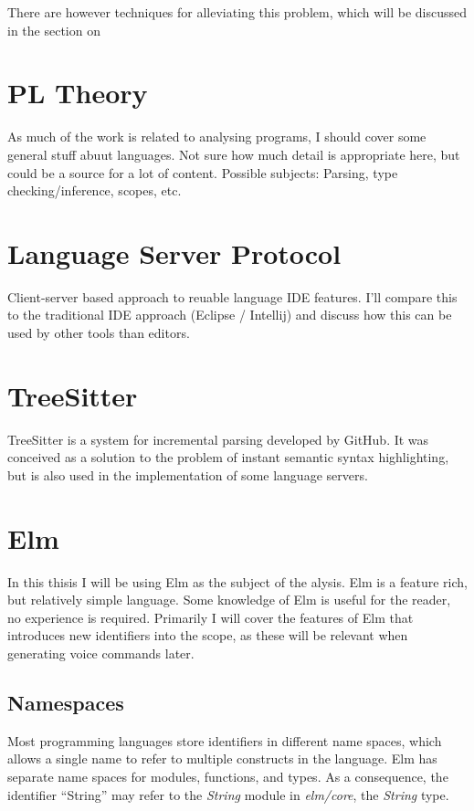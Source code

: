 \documentclass[../thesis.tex]{subfiles}
\begin{document}
There are however techniques for alleviating this problem, which will be discussed in the section on~



\section{PL Theory}
As much of the work is related to analysing programs, I should cover some general stuff abuut languages.
Not sure how much detail is appropriate here, but could be a source for a lot of content.
Possible subjects: Parsing, type checking/inference, scopes, etc.

\section{Language Server Protocol}
Client-server based approach to reuable language IDE features.
I'll compare this to the traditional IDE approach (Eclipse / Intellij)
and discuss how this can be used by other tools than editors.

\section{TreeSitter}
TreeSitter is a system for incremental parsing developed by GitHub.
It was conceived as a solution to the problem of instant semantic syntax highlighting,
but is also used in the implementation of some language servers.

\section{Elm}\label{sec:elm}
In this thisis I will be using Elm as the subject of the alysis.
Elm is a feature rich, but relatively simple language.
Some knowledge of Elm is useful for the reader, no experience is required.
Primarily I will cover the features of Elm that introduces new identifiers into the scope,
as these will be relevant when generating voice commands later.

\subsection{Namespaces}
Most programming languages store identifiers in different name spaces, which allows a single name
to refer to multiple constructs in the language.
Elm has separate name spaces for modules, functions, and types.
As a consequence, the identifier ``String'' may refer to the \textit{String} module in \textit{elm/core}, the \textit{String} type.
\end{document}
